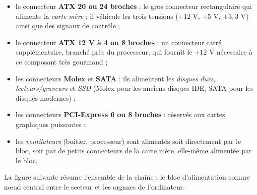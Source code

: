 \documentclass[11pt]{article}
\begin{document}
\begin{itemize}
\item le connecteur \textbf{ATX 20 ou 24 broches} : le gros connecteur rectangulaire qui alimente la \emph{carte mère} ; il véhicule les trois tensions ($+12$ V, $+5$ V, $+3,3$ V) ainsi que des signaux de contrôle ;
\item le connecteur \textbf{ATX 12 V à 4 ou 8 broches} : un connecteur carré supplémentaire, branché près du processeur, qui fournit le $+12$ V nécessaire à ce composant très gourmand ;
\item les connecteurs \textbf{Molex} et \textbf{SATA} : ils alimentent les \emph{disques durs}, \emph{lecteurs/graveurs} et \emph{SSD} (Molex pour les anciens disques IDE, SATA pour les disques modernes) ;
\item les connecteurs \textbf{PCI-Express 6 ou 8 broches} : réservés aux cartes graphiques puissantes ;
\item les \emph{ventilateurs} (boîtier, processeur) sont alimentés soit directement par le bloc, soit par de petits connecteurs de la carte mère, elle-même alimentée par le bloc.
\end{itemize}

La figure suivante résume l'ensemble de la chaîne : le bloc d'alimentation comme nœud central entre le secteur et les organes de l'ordinateur.
\end{document}
